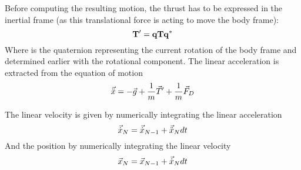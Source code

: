 Before computing the resulting motion, the thrust has to be expressed in the
inertial frame (as this translational force is acting to move the body frame):
\begin{equation}
	\mathbf{T'} = \mathbf{q}\mathbf{T}\mathbf{q^*}
\end{equation}
Where  is the quaternion representing the current rotation of the body
frame and determined earlier with the rotational component.
The linear acceleration is extracted from the equation of motion
\begin{equation}\labeleq{thrustEquation}
	\v{\ddot{x}} = -\v{g} + \inv{m}\v{T}' + \inv{m}\v{F}_D
\end{equation}

The linear velocity is given by numerically integrating the linear acceleration 
\begin{equation}
	\vec{\dot{x}}_N = \vec{\dot{x}}_{N-1} + \vec{\ddot{x}}_N dt
\end{equation}
And the position by numerically integrating the linear velocity
\begin{equation}
	\vec{x}_N = \vec{x}_{N-1} + \vec{\dot{x}}_N dt
\end{equation}


